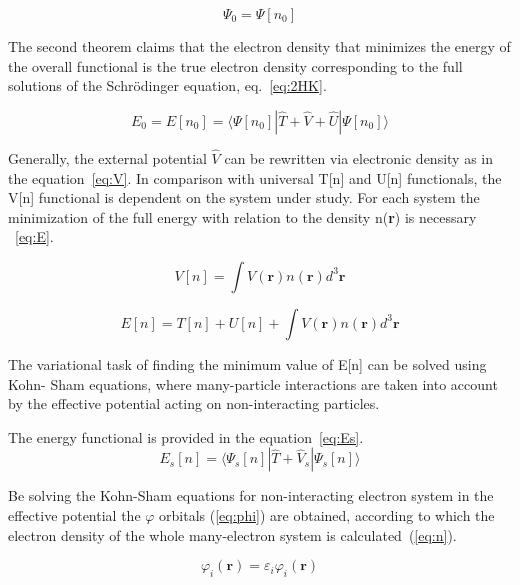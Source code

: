 \begin{equation}
\Psi_0 = \Psi[n_0] 
\label{eq:1HK}
\end{equation}

The second theorem claims that the electron density that minimizes the energy of the overall functional is the true electron density corresponding to the full solutions of the Schr\"odinger equation, eq.~\ref{eq:2HK}.

\begin{equation}
E_0 = E[n_0] = \langle \Psi[n_0]| \hat T + \hat V + \hat U |\Psi[n_0] \rangle
\label{eq:2HK}
\end{equation}

Generally, the external potential $\hat V$ can be rewritten via electronic density as in the equation~\ref{eq:V}. In comparison with universal T[n] and U[n] functionals, the V[n] functional is dependent on the system under study. For each system the minimization of the full energy with relation to the density n(\textbf{r}) is necessary ~\ref{eq:E}.

\begin{equation}
V[n] = \int V(\textbf{r})n(\textbf{r})d^3\textbf{r}
\label{eq:V}
\end{equation}

\begin{equation}
E[n] = T[n] + U[n] + \int V(\textbf{r})n(\textbf{r})d^3\textbf{r}
\label{eq:E}
\end{equation}

The variational task of finding the minimum value of  E[n] can be solved using Kohn-
Sham equations, where many-particle interactions are taken into account by the effective potential acting on non-interacting particles.

The energy functional is provided in the equation~\ref{eq:Es}.
\begin{equation}
E_s[n] = \langle \Psi_s[n]| \hat T + \hat V_s |\Psi_s[n] \rangle
\label{eq:Es}
\end{equation}

Be solving the Kohn-Sham equations for non-interacting electron system in the effective potential the  $\varphi$ orbitals (\ref{eq:phi}) are obtained, according to which the electron density of the whole many-electron system is calculated~(\ref{eq:n}).

\begin{equation}
[-\frac{\hslash\hbar^2}{2m}\bigtriangledown_i^2+V_s(\textbf{r})] \varphi_i (\textbf{r}) = \varepsilon_i \varphi_i (\textbf{r})
\label{eq:phi}
\end{equation}


